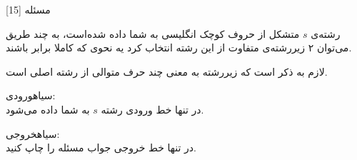 ‌مسئله [15]

% 
%
%
% 

رشته‌ی 
$s$
متشکل از حروف کوچک انگلیسی به شما داده شده‌است، به چند طریق می‌توان ۲ زیررشته‌ی متفاوت از این رشته انتخاب کرد یه نحوی که کاملا برابر باشند.

لازم به ذکر است که
زیررشته به معنی چند حرف متوالی از رشته اصلی است.

‌سیاه{ورودی:}\\
در تنها خط ورودی رشته
 $s$
به شما داده می‌شود.

‌سیاه{خروجی:}\\
در تنها خط خروجی جواب مسئله را چاپ کنید.

